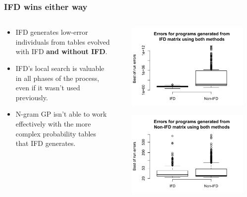 \documentclass{beamer}
\newcommand{\linespace}{\vskip 0.25cm}
\begin{document}
\begin{frame}
\frametitle{IFD wins either way}

\begin{columns}
\begin{column}{0.6\textwidth}

\begin{itemize}
	\item IFD generates low-error individuals from tables evolved with IFD \textbf{and without IFD}.
	\linespace
	\item IFD's local search is valuable in all phases of the process, even if it wasn't used previously.
	\linespace
	\item N-gram GP isn't able to work effectively with the more complex probability tables that IFD generates.
\end{itemize}
\end{column}

\begin{column}{0.02\textwidth}
\end{column}

\begin{column}{0.5\textwidth}

\includegraphics[width=0.915\textwidth]{Fig/FigD.pdf}

\includegraphics[width=0.915\textwidth]{Fig/FigE.pdf}

\end{column}
\end{columns}

\end{frame}
\end{document}
